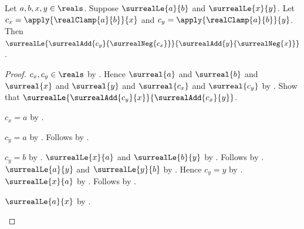 \begin{lemma}\label{real_clamp_ordered_difference_bound}
    Let $a,b,x,y\in\reals$.
    Suppose $\surrealLe{a}{b}$ and $\surrealLe{x}{y}$.
    Let $c_x=\apply{\realClamp{a}{b}}{x}$ and
        $c_y=\apply{\realClamp{a}{b}}{y}$.
    Then
        $\surrealLe{\surrealAdd{c_y}{\surrealNeg{c_x}}}
            {\surrealAdd{y}{\surrealNeg{x}}}$.
\end{lemma}
\begin{proof}
    $c_x,c_y\in\reals$
        by .
    Hence $\surreal{a}$ and $\surreal{b}$ and $\surreal{x}$ and
        $\surreal{y}$ and $\surreal{c_x}$ and $\surreal{c_y}$
        by .
    Show that
        $\surrealLe{\surrealAdd{c_y}{x}}{\surrealAdd{c_x}{y}}$.
    \begin{subproof}
        \begin{byCase}
            $c_x=a$ by
                .
            \begin{byCase}
                $c_y=a$ by
                    .
                Follows by
                    .
                \begin{byCase}
                    $c_y=b$ by
                        .
                    $\surrealLe{x}{a}$ and $\surrealLe{b}{y}$
                        by .
                    Follows by
                        .
                    $\surrealLe{a}{y}$ and $\surrealLe{y}{b}$
                        by .
                    Hence $c_y=y$ by
                        .
                    $\surrealLe{x}{a}$ by .
                    Follows by
                        .
                \end{byCase}
            \end{byCase}
            $\surrealLe{a}{x}$ by .
            \begin{byCase}

\end{byCase}
\end{byCase}
\end{subproof}
\end{proof}
